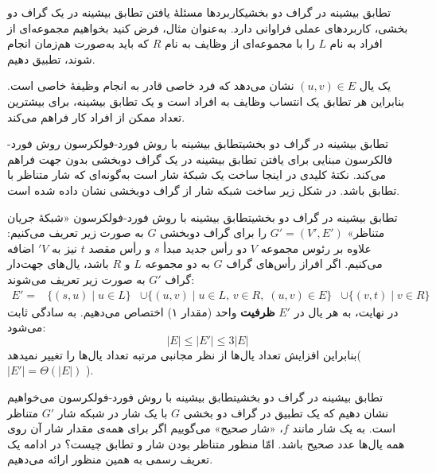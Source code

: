 \begin{itemframe-s}{تطابق بیشینه در گراف دو بخشی}{کاربرد‌ها}
\itm
مسئلهٔ یافتن تطابق بیشینه در یک گراف دو بخشی، کاربردهای عملی فراوانی دارد.
\itm
 به‌عنوان مثال، فرض کنید بخواهیم مجموعه‌ای از افراد‌ به نام $L$ را با مجموعه‌ای از وظایف به نام $R$ که باید به‌صورت هم‌زمان انجام شوند، تطبیق دهیم.

یک یال
 $(u, v) \in E$
نشان می‌دهد که فرد خاصی قادر به انجام وظیفهٔ خاصی است.
\itm
بنابراین هر تطابق یک انتساب وظایف به افراد‌ است و یک تطابق بیشینه، برای بیشترین تعداد ممکن از افراد‌ کار فراهم می‌کند.
\end{itemframe-s}


\begin{itemframe-s}{تطابق بیشینه در گراف دو بخشی}{تطابق بیشینه با روش فورد-فولکرسون}
\itm
روش فورد-فالکرسون مبنایی برای یافتن تطابق بیشینه در یک گراف دوبخشی بدون جهت فراهم می‌کند. نکتهٔ کلیدی در اینجا ساخت یک شبکهٔ شار است به‌گونه‌ای که شار متناظر با تطابق باشد. در شکل زیر ساخت شبکه شار از گراف دوبخشی نشان داده شده است.

\end{itemframe-s}


\begin{itemframe-s}{تطابق بیشینه در گراف دو بخشی}{تطابق بیشینه با روش فورد-فولکرسون}
\itm
«شبکهٔ جریان متناظر»
 $G' = (V', E')$
را برای گراف دوبخشی $G$ به صورت زیر تعریف می‌کنیم:
علاوه بر رئوس مجموعه $V$ دو رأس جدید مبدأ $s$ و رأس مقصد $t$ نیز به $'V$ اضافه می‌کنیم.
اگر افراز رأس‌های گراف $G$ به دو مجموعه $L$ و $R$ باشد، یال‌های جهت‌دار گراف $G'$ به صورت زیر تعریف می‌شوند:
\begin{align*}
E' = & \{(s, u) \mid u \in L\}
 	  &\cup \{(u, v) \mid u \in L,\, v \in R,\; (u, v) \in E\}
	  &\cup \{(v, t) \mid v \in R\}
\end{align*}
\itm
در نهایت، به هر یال در $E'$
 \textbf{ظرفیت}
واحد (مقدار ۱) اختصاص می‌دهیم.
\itm
به سادگی ثابت می‌شود:
$$
|E| \leq |E'| \leq 3|E|
$$
بنابراین افزایش تعداد یال‌ها از نظر مجانبی مرتبه تعداد یال‌ها را تغییر نمیدهد(
$|E'| = \Theta(|E|)$
).
\end{itemframe-s}


\begin{itemframe-s}{تطابق بیشینه در گراف دو بخشی}{تطابق بیشینه با روش فورد-فولکرسون}
\itm
می‌خواهیم نشان دهیم که یک تطبیق در گراف دو بخشی $G$ با یک شار در شبکه شار $G'$ متناظر است.
\itm
به یک شار مانند $f$، «شار صحیح»
 می‌گوییم اگر برای همه‌ی مقدار شار آن روی همه یال‌ها عدد صحیح باشد.
\itm
امّا منظور متناظر بودن شار و تطابق چیست؟ در ادامه یک تعریف رسمی به همین منظور ارائه می‌دهیم.
\end{itemframe-s}


